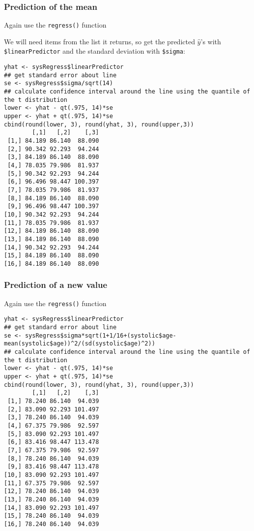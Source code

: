 \documentclass[pdf]{beamer}
\begin{document}
\begin{frame}[fragile]
\frametitle{Prediction of the mean}
Again use the \texttt{regress()} function

We will need items from the list it returns, so get the predicted $\hat{y}$'s with \texttt{\$linearPredictor} and the standard deviation with \texttt{\$sigma}:
{\fontsize{5pt}{5.2}\selectfont
\begin{verbatim}
yhat <- sysRegress$linearPredictor
## get standard error about line
se <- sysRegress$sigma/sqrt(14)
## calculate confidence interval around the line using the quantile of the t distribution
lower <- yhat - qt(.975, 14)*se
upper <- yhat + qt(.975, 14)*se
cbind(round(lower, 3), round(yhat, 3), round(upper,3))
        [,1]   [,2]    [,3]
 [1,] 84.189 86.140  88.090
 [2,] 90.342 92.293  94.244
 [3,] 84.189 86.140  88.090
 [4,] 78.035 79.986  81.937
 [5,] 90.342 92.293  94.244
 [6,] 96.496 98.447 100.397
 [7,] 78.035 79.986  81.937
 [8,] 84.189 86.140  88.090
 [9,] 96.496 98.447 100.397
[10,] 90.342 92.293  94.244
[11,] 78.035 79.986  81.937
[12,] 84.189 86.140  88.090
[13,] 84.189 86.140  88.090
[14,] 90.342 92.293  94.244
[15,] 84.189 86.140  88.090
[16,] 84.189 86.140  88.090
\end{verbatim} }
\end{frame}

\begin{frame}[fragile]
\frametitle{Prediction of a new value}
Again use the \texttt{regress()} function
{\fontsize{5pt}{5.2}\selectfont
\begin{verbatim}
yhat <- sysRegress$linearPredictor
## get standard error about line
se <- sysRegress$sigma*sqrt(1+1/16+(systolic$age-mean(systolic$age))^2/(sd(systolic$age)^2))
## calculate confidence interval around the line using the quantile of the t distribution
lower <- yhat - qt(.975, 14)*se
upper <- yhat + qt(.975, 14)*se
cbind(round(lower, 3), round(yhat, 3), round(upper,3))
        [,1]   [,2]    [,3]
 [1,] 78.240 86.140  94.039
 [2,] 83.090 92.293 101.497
 [3,] 78.240 86.140  94.039
 [4,] 67.375 79.986  92.597
 [5,] 83.090 92.293 101.497
 [6,] 83.416 98.447 113.478
 [7,] 67.375 79.986  92.597
 [8,] 78.240 86.140  94.039
 [9,] 83.416 98.447 113.478
[10,] 83.090 92.293 101.497
[11,] 67.375 79.986  92.597
[12,] 78.240 86.140  94.039
[13,] 78.240 86.140  94.039
[14,] 83.090 92.293 101.497
[15,] 78.240 86.140  94.039
[16,] 78.240 86.140  94.039
\end{verbatim} }
\end{frame}
\end{document}
